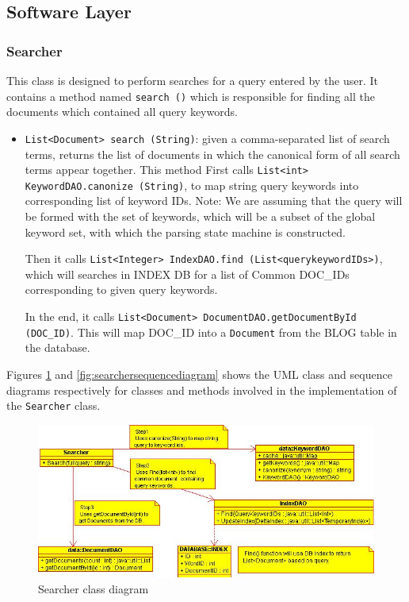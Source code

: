\documentclass[10pt]{report}
\begin{document}
\subsection{Software Layer}

\subsubsection{Searcher}
This class is designed to perform searches for a query entered by the
user. It contains a method named \texttt{search ()} which is responsible for
finding all the documents which contained all query keywords.

\begin{itemize}
\item \texttt{List<Document> search (String)}: given a comma-separated
  list of search terms, returns the list of documents in which
  the canonical form of all search terms appear together. This method
  First calls \texttt{List<int> KeywordDAO.canonize (String)}, to map
  string query keywords into corresponding list of keyword IDs.  Note:
  We are assuming that the query will be formed with the set of
  keywords, which will be a subset of the global keyword set, with which
  the parsing state machine is constructed.

  Then it calls \texttt{List<Integer> IndexDAO.find (List<querykeywordIDs>)},
  which will searches in INDEX DB for a list of Common DOC\_IDs
  corresponding to given query keywords. 

  In the end, it calls \texttt{List<Document>
    DocumentDAO.getDocumentById (DOC\_ID)}. This will map DOC\_ID into
  a \texttt{Document} from the BLOG table in the database.  
\end{itemize}
 
Figures \ref{fig:searcherclassdiagram} and
\ref{fig:searchersequencediagram} shows the UML class and sequence
diagrams respectively for classes and methods involved in the
implementation of the \texttt{Searcher} class.


\begin{figure}
  \begin{center}
	\includegraphics[width=\textwidth,height=!]{searcherclassdiagram}
  \end{center}
  \caption{Searcher class diagram}
  \label{fig:searcherclassdiagram}
\end{figure} 
\end{document}

